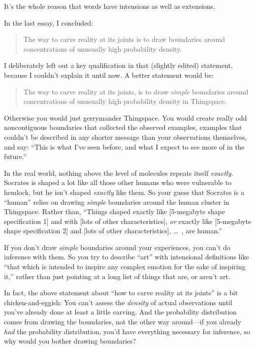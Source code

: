 {
 It's the whole reason that words have intensions
as well as extensions.}

{
 In the last essay, I concluded:}

\begin{quote}
 The way to carve reality at its joints is to draw boundaries
 around concentrations of unusually high probability density.
\end{quote}

{
 I deliberately left out a key qualification in that (slightly
edited) statement, because I couldn't explain it until
now. A better statement would be:}

\begin{quote}
 The way to carve reality at its joints, is to draw \textit{simple}
boundaries around concentrations of unusually high probability density
in Thingspace.
\end{quote}

{
 Otherwise you would just gerrymander Thingspace. You would create
really odd noncontiguous boundaries that collected the observed
examples, examples that couldn't be described in any
shorter message than your observations themselves, and say:
``This is what I've seen before, and
what I expect to see more of in the future.''}

{
 In the real world, nothing above the level of molecules repeats
itself \textit{exactly.} Socrates is shaped a lot like all those other
humans who were vulnerable to hemlock, but he isn't
shaped \textit{exactly} like them. So your guess that Socrates is a
``human'' relies on drawing
\textit{simple} boundaries around the human cluster in Thingspace.
Rather than, ``Things shaped exactly like [5-megabyte
shape specification 1] and with [lots of other characteristics],
\textit{or} exactly like [5-megabyte shape specification 2] and [lots
of other characteristics], \ldots~, are human.''}

{
 If you don't draw \textit{simple} boundaries
around your experiences, you can't do inference with
them. So you try to describe ``art''
with intensional definitions like ``that which is
intended to inspire any complex emotion for the sake of inspiring
it,'' rather than just pointing at a long list of
things that are, or aren't art.}

{
 In fact, the above statement about ``how to carve
reality at its joints'' is a bit chicken-and-eggish:
You can't assess the \textit{density} of actual
observations until you've already done at least a
little carving. And the probability distribution comes from drawing the
boundaries, not the other way around---if you already \textit{had} the
probability distribution, you'd have everything
necessary for inference, so why would you bother drawing boundaries?}

